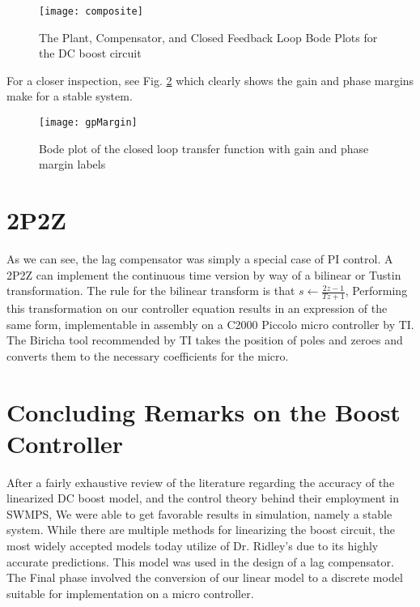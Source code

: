 \begin{figure}[htbp]
\begin{center}
\texttt{[image: composite]}
\caption{The Plant, Compensator, and Closed Feedback Loop Bode Plots for the DC boost circuit}
\label{composite}
\end{center}
\end{figure}

For a closer inspection, see Fig. \ref{gpMargin} which clearly shows the gain and phase margins make for a stable system. 

\begin{figure}[htbp]
\begin{center}
\texttt{[image: gpMargin]}
\caption{Bode plot of the closed loop transfer function with gain and phase margin labels}
\label{gpMargin}
\end{center}
\end{figure}

\section{2P2Z}
As we can see, the lag compensator was simply a special case of PI control. A 2P2Z can implement the continuous time version by way of a bilinear or Tustin transformation. The rule for the bilinear transform is that $s\leftarrow\frac{2z-1}{Tz+1}$, Performing this transformation on our controller equation results in an expression of the same form, implementable in assembly on a C2000 Piccolo micro controller by TI. The Biricha tool recommended by TI takes the position of poles and zeroes and converts them to the necessary coefficients for the micro.

\section{Concluding Remarks on the Boost Controller}
After a fairly exhaustive review of the literature regarding the accuracy of the linearized DC boost model, and the control theory behind their employment in SWMPS, We were able to get favorable results in simulation, namely a stable system. While there are multiple methods for linearizing the boost circuit, the most widely accepted models today utilize of Dr. Ridley's due to its highly accurate predictions. This model was used in the design of a lag compensator. The Final phase involved the conversion of our linear model to a discrete model suitable for implementation on a micro controller.